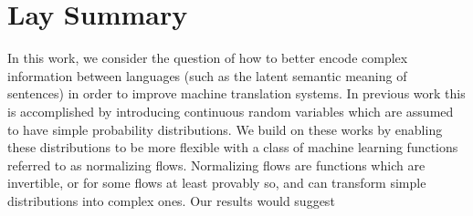 

\chapter{Lay Summary}

In this work, we consider the question of how to better encode complex information between languages (such as the latent semantic meaning of sentences) in order to improve machine translation systems. In previous work this is accomplished by introducing continuous random variables which are assumed to have simple probability distributions. We build on these works by enabling these distributions to be more flexible with a class of machine learning functions referred to as normalizing flows. Normalizing flows are functions which are invertible, or for some flows at least provably so, and can transform simple distributions into complex ones. Our results would suggest 

